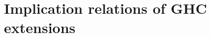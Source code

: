 \documentclass[main.tex]{subfiles}
\begin{document}
	\section{Implication relations of GHC extensions}
	
\end{document}
